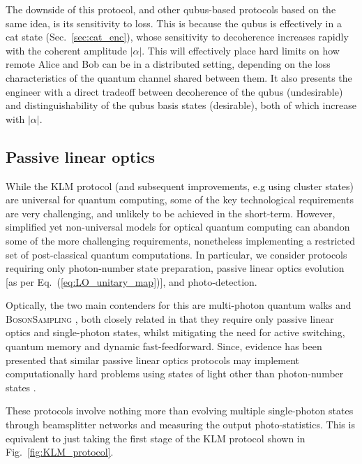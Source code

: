 The downside of this protocol, and other qubus-based protocols based on the same idea, is its sensitivity to loss. This is because the qubus is effectively in a cat state (Sec.~\ref{sec:cat_enc}), whose sensitivity to decoherence increases rapidly with the coherent amplitude $|\alpha|$. This will effectively place hard limits on how remote Alice and Bob can be in a distributed setting, depending on the loss characteristics of the quantum channel shared between them. It also presents the engineer with a direct tradeoff between decoherence of the qubus (undesirable) and distinguishability of the qubus basis states (desirable), both of which increase with $|\alpha|$.

%
%

\subsection{Passive linear optics} \label{sec:passive_LO} 

While the KLM protocol (and subsequent improvements, e.g using cluster states) are universal for quantum computing, some of the key technological requirements are very challenging, and unlikely to be achieved in the short-term. However, simplified yet non-universal models for optical quantum computing can abandon some of the more challenging requirements, nonetheless implementing a restricted set of post-classical quantum computations. In particular, we consider protocols requiring only photon-number state preparation, passive linear optics evolution [as per Eq.~(\ref{eq:LO_unitary_map})], and photo-detection.

Optically, the two main contenders for this are multi-photon quantum walks \cite{bib:Aharonov93, bib:Aharonov01, bib:Kempe03, bib:Childs09, bib:Salvador12, bib:RohdeMultiWalk11} and \textsc{BosonSampling} \cite{bib:AaronsonArkhipov10, bib:RohdeIntroBS15}, both closely related in that they require only passive linear optics and single-photon states, whilst mitigating the need for active switching, quantum memory and dynamic fast-feedforward. Since, evidence has been presented that similar passive linear optics protocols may implement computationally hard problems using states of light other than photon-number states \cite{bib:RandBS, bib:RohdePhotAdd15, bib:RohdeDisp15, bib:RohdeCat15}.

These protocols involve nothing more than evolving multiple single-photon states through beamsplitter networks and measuring the output photo-statistics. This is equivalent to just taking the first stage of the KLM protocol shown in Fig.~\ref{fig:KLM_protocol}.


